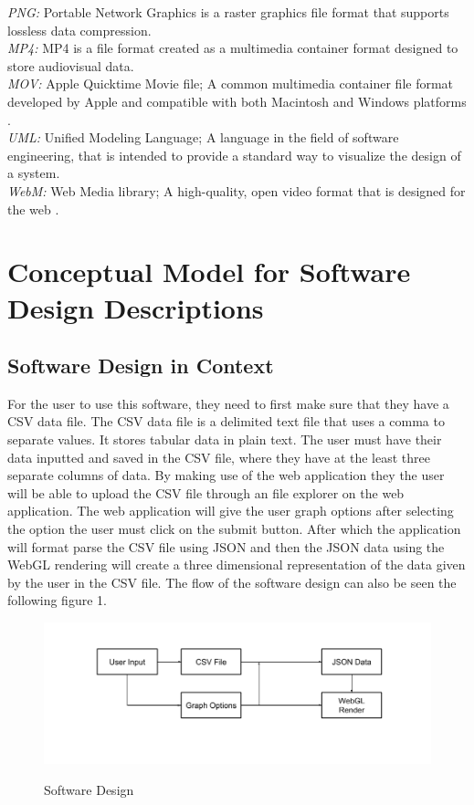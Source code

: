 \documentclass[journal,10pt,onecolumn,compsoc]{IEEEtran} \usepackage[margin=1.0in]{geometry} \usepackage{pdfpages}
\begin{document}
    \textit{PNG: }Portable Network Graphics is a raster graphics file format that supports lossless data compression\cite{PNG}.\\
    \textit{MP4: }MP4 is a file format created as a multimedia container format designed to store audiovisual data.\\
    \textit{MOV: } Apple Quicktime Movie file; A common multimedia container file format developed by Apple and compatible with both Macintosh and Windows platforms \cite{MOV}.\\
    \textit{UML: }Unified Modeling Language; A language in the field of software engineering, that is intended to provide a standard way to visualize the design of a system\cite{UML}.\\ 
    \textit{WebM: } Web Media library; A high-quality, open video format that is designed for the web \cite{WebM}.\\
    
\section{Conceptual Model for Software Design Descriptions}
    \subsection{Software Design in Context}
    For the user to use this software, they need to first make sure that they have a CSV data file. The CSV data file is a delimited text file that uses a comma to separate values. It stores tabular data in plain text. The user must have their data inputted and saved in the CSV file, where they have at the least three separate columns of data. By making use of the web application they the user will be able to upload the CSV file through an file explorer on the web application. The web application will give the user graph options after selecting the option the user must click on the submit button. After which the application will format parse the CSV file using JSON and then the JSON data using the WebGL rendering will create a three dimensional representation of the data given by the user in the CSV file. The flow of the software design can also be seen the following figure 1.
    \begin{figure}[H]
        \centering
         \caption{Software Design}
         \includegraphics[width=\linewidth]{designDocFlowchartEdit.png}
        \label{fig:my_label}
    \end{figure}
\end{document}
